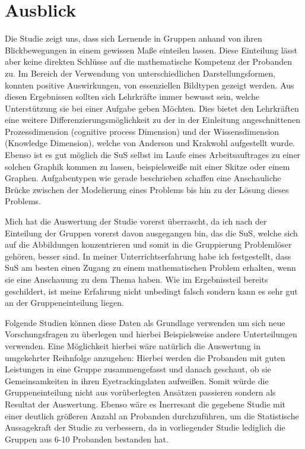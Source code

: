\chapter{Ausblick}
Die Studie zeigt uns, dass sich Lernende in Gruppen anhand von ihren Blickbewegungen in einem gewissen Maße einteilen lassen. Diese Einteilung lässt aber keine direkten Schlüsse auf die mathematische Kompetenz der Probanden zu.  Im Bereich der Verwendung von unterschiedlichen Darstellungsformen, konnten positive Auswirkungen, von essenziellen Bildtypen gezeigt werden.  Aus diesen Ergebnissen sollten sich Lehrkräfte immer bewusst sein, welche Unterstützung sie bei einer Aufgabe geben Möchten. Dies bietet den Lehrkräften eine weitere Differenzierungsmöglichkeit zu der in der Einleitung angeschnittenen Prozessdimension (cognitive process Dimension) und der Wissensdimension (Knowledge Dimension), welche von Anderson und Krakwohl aufgestellt wurde. Ebenso ist es gut möglich die SuS selbst im Laufe eines Arbeitsauftrages zu einer solchen Graphik kommen zu lassen, beispielsweiße mit einer Skitze oder einem Graphen. Aufgabentypen wie gerade beschrieben schaffen eine Anschauliche Brücke zwischen der Modelierung eines Problems bis hin zu der Lösung dieses Problems.


Mich hat die Auswertung der Studie vorerst überrascht, da ich nach der Einteilung der Gruppen vorerst davon ausgegangen bin, das die SuS, welche sich auf die Abbildungen konzentrieren und somit in die Gruppierung Problemlöser gehören, besser sind. In meiner Unterrichtserfahrung habe ich festgestellt, dass SuS am besten einen Zugang zu einem mathematischen Problem erhalten, wenn sie eine Anschauung zu dem Thema haben. Wie im Ergebnissteil bereits geschildert, ist meine Erfahrung nicht unbedingt falsch sondern kann es sehr gut an der Gruppeneinteilung liegen. 


Folgende Studien können diese Daten als Grundlage verwenden um sich neue Vorschungsfragen zu überlegen und hierbei Beispielsweise andere Unterteilungen verwenden. Eine Möglichkeit hierbei wäre natürlich die Auswertung in umgekehrter Reihnfolge anzugehen: Hierbei werden die Probanden mit guten Leistungen in eine Gruppe zusammengefasst und danach geschaut, ob sie Gemeinsamkeiten in ihren Eyetrackingdaten aufweißen. Somit würde die Gruppeneinteilung nicht aus vorüberlegten Ansätzen passieren sondern als Resultat der Auswertung. 
Ebenso wäre es Inerresant die gegebene Studie mit einer deutlich größeren Anzahl an Probanden durchzuführen, um die Statistische Aussagekraft der Studie zu verbessern, da in vorliegender Studie lediglich die Gruppen aus 6-10 Probanden bestanden hat.